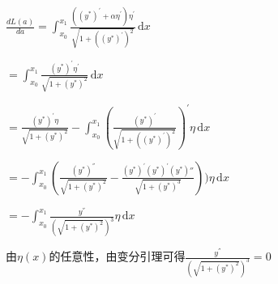 \documentclass{article}
\begin{document}
$\frac{dL(a)}{da}=\int_{x_{0}}^{x_{1}}\frac{((y^{*})^{'}+\alpha\eta^{'})\eta^{'}}{\sqrt{1+((y^{*})^{'})^2}}\,\mathrm{d}x$

$=\int_{x_{0}}^{x_{1}}\frac{(y^{*})^{'}\eta^{'}}{\sqrt{1+(y^{*})^2}}\,\mathrm{d}x$ 

$=\frac{(y^{*})^{'}\eta}{\sqrt{1+(y^{*})^2}}-\int_{x_{0}}^{x_{1}}(\frac{(y^{*})^{'}}{\sqrt{1+((y^{*})^{'})^2}})^{'}\eta\,\mathrm{d}x$

$=-\int_{x_{0}}^{x_{1}}(\frac{(y^{*})^{''}}{\sqrt{1+(y^{*})^2}}-\frac{(y^{*})^{'} (y^{*})^{'}(y^{*}){''}}{\sqrt{1+(y^{*})^3}}))\eta\,\mathrm{d}x$

$=-\int_{x_{0}}^{x_{1}}\frac{y^{''}}{(\sqrt{1+(y^{*})^{2}})^{3}}\eta\,\mathrm{d}x$

由$\eta(x)$的任意性，由变分引理可得$\frac{y^{''}}{(\sqrt{1+(y^{*})^{2}})^{3}}=0$


\end{document}
